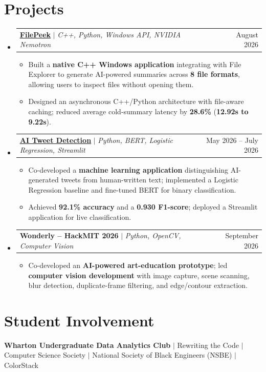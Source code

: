 \documentclass[letterpaper,10pt]{article}
\makeatletter
\newcommand{\resumeItem}[1]{\item \small{#1}}
\newcommand{\resumeProject}[3]{
\item \begin{tabularx}{\linewidth}{@{}X r@{}}
\small\textbf{#1} $|$ \small\emph{#2} & \small #3
\end{tabularx}\vspace{-2pt}
}
\newcommand{\resumeSubHeadingListStart}{
\begin{itemize}[
leftmargin=0pt,label={},itemsep=2pt,
topsep=2pt,parsep=0pt,partopsep=0pt
]
}
\newcommand{\resumeSubHeadingListEnd}{
\end{itemize}\vspace{2pt}
}
\newcommand{\resumeItemListStart}{
\begin{itemize}[
leftmargin=0.18in,label=\textbullet,
itemsep=1pt,topsep=1pt,parsep=0pt,partopsep=0pt
]
}
\newcommand{\resumeItemListEnd}{
\end{itemize}\vspace{1pt}
}
\makeatother
\begin{document}
\section{Projects}
\resumeSubHeadingListStart
\resumeProject
{\href{https://waguea.github.io/File-Peek/}
{\underline{FilePeek}}}
{C++, Python, Windows API, NVIDIA Nemotron}
{August 2026}
\resumeItemListStart
\resumeItem{
Built a \textbf{native C++ Windows application} integrating with File Explorer to generate AI-powered summaries across \textbf{8 file formats}, allowing users to inspect files without opening them.
}
\resumeItem{
Designed an asynchronous C++/Python architecture with file-aware caching; reduced average cold-summary latency by \textbf{28.6\%} (\textbf{12.92s to 9.22s}).
}
\resumeItemListEnd
\resumeProject
{\href{https://amgazal.github.io/Machine-Learning-project-22D/}
{\underline{AI Tweet Detection}}}
{Python, BERT, Logistic Regression, Streamlit}
{May 2026 -- July 2026}
\resumeItemListStart
\resumeItem{
Co-developed a \textbf{machine learning application} distinguishing AI-generated tweets from human-written text; implemented a Logistic Regression baseline and fine-tuned BERT for binary classification.
}
\resumeItem{
Achieved \textbf{92.1\% accuracy} and a \textbf{0.930 F1-score}; deployed a Streamlit application for live classification.
}
\resumeItemListEnd
\resumeProject
{Wonderly -- HackMIT 2026}
{Python, OpenCV, Computer Vision}
{September 2026}
\resumeItemListStart
\resumeItem{
Co-developed an \textbf{AI-powered art-education prototype}; led \textbf{computer vision development} with image capture, scene scanning, blur detection, duplicate-frame filtering, and edge/contour extraction.
}
\resumeItemListEnd
\resumeSubHeadingListEnd
\section{Student Involvement}
{\small
\textbf{Wharton Undergraduate Data Analytics Club} $|$ Rewriting the Code $|$ Computer Science Society $|$ National Society of Black Engineers (NSBE) $|$ ColorStack
}
\end{document}
